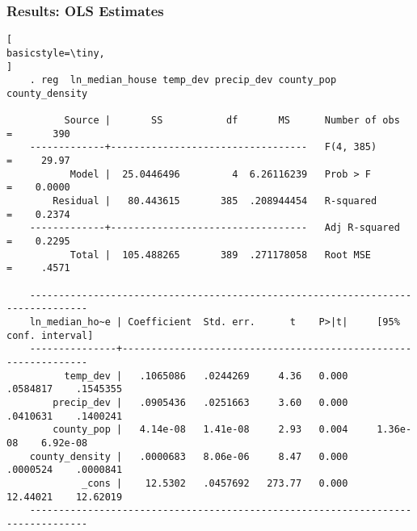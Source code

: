 \documentclass{beamer}
\begin{document}
\begin{frame}[fragile]
\frametitle{Results: OLS Estimates}
\begin{lstlisting}[
basicstyle=\tiny,
]
    . reg  ln_median_house temp_dev precip_dev county_pop county_density

          Source |       SS           df       MS      Number of obs   =       390
    -------------+----------------------------------   F(4, 385)       =     29.97
           Model |  25.0446496         4  6.26116239   Prob > F        =    0.0000
        Residual |   80.443615       385  .208944454   R-squared       =    0.2374
    -------------+----------------------------------   Adj R-squared   =    0.2295
           Total |  105.488265       389  .271178058   Root MSE        =     .4571

    --------------------------------------------------------------------------------
    ln_median_ho~e | Coefficient  Std. err.      t    P>|t|     [95% conf. interval]
    ---------------+----------------------------------------------------------------
          temp_dev |   .1065086   .0244269     4.36   0.000     .0584817    .1545355
        precip_dev |   .0905436   .0251663     3.60   0.000     .0410631    .1400241
        county_pop |   4.14e-08   1.41e-08     2.93   0.004     1.36e-08    6.92e-08
    county_density |   .0000683   8.06e-06     8.47   0.000     .0000524    .0000841
             _cons |    12.5302   .0457692   273.77   0.000     12.44021    12.62019
    --------------------------------------------------------------------------------

\end{lstlisting}
\end{frame}
\end{document}
